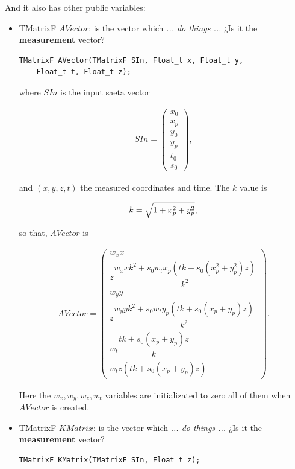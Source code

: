 \documentclass[a4paper]{book}
\begin{document}
And it also has other public variables:

\begin{itemize}
	\item TMatrixF $AVector$: is the vector which \textit{... do things ...} ¿Is it the \textbf{measurement} vector?
	\begin{lstlisting}
TMatrixF AVector(TMatrixF SIn, Float_t x, Float_t y,
	Float_t t, Float_t z);
	\end{lstlisting}

	where $SIn$ is the input saeta vector

	\begin{align*}
	SIn = \left(
	\begin{array}{c}
	x_0\\
	x_p\\
	y_0\\
	y_p\\
	t_0\\
	s_0
	\end{array} \right),
	\end{align*}
	
	and $(x, y, z, t)$ the measured coordinates and time. The $k$ value is 
	
	\begin{equation}
	\notag
	k = \sqrt{1 + x_p^2 + y_p^2},
	\end{equation}
	
	so that, $AVector$ is
	
	\begin{align*}
	AVector = \left(
	\begin{array}{c}
	w_x x\\
	z \dfrac{w_x x k^2 + s_0 w_t x_p (t k + s_0 (x_p^2 + y_p^2) z)}{k^2}\\
	w_y y\\
	z \dfrac{w_y y k^2 + s_0 w_t y_p (t k + s_0 (x_p + y_p) z)}{k^2}\\
	w_t \dfrac{t k + s_0 (x_p + y_p) z}{k}\\
	w_t z (t k + s_0 (x_p + y_p) z)
	\end{array} \right).
	\end{align*}
	
	Here the $w_x, w_y, w_z, w_t$ variables are initializated to zero all of them when $AVector$ is created.
	
	\item TMatrixF $KMatrix$: is the vector which \textit{... do things ...} ¿Is it the \textbf{measurement} vector?
	\begin{lstlisting}
TMatrixF KMatrix(TMatrixF SIn, Float_t z);
	\end{lstlisting}


\end{itemize}
\end{document}
